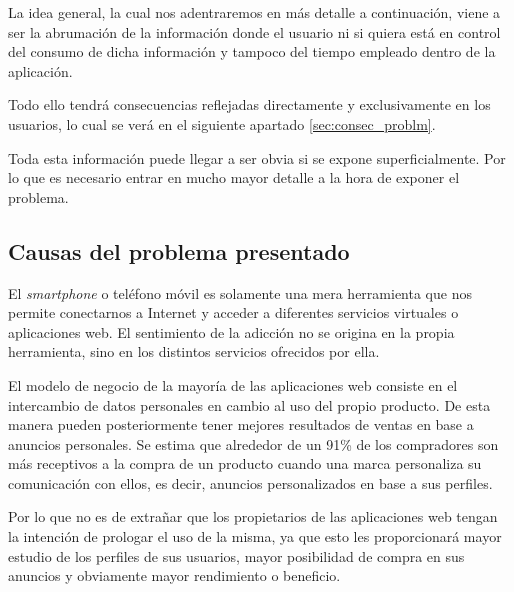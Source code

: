 \vspace{0.3cm}

La idea general, la cual nos adentraremos en más detalle a continuación, viene a ser la abrumación de la información donde el usuario ni si quiera está en control del consumo de dicha información y tampoco del tiempo empleado dentro de la aplicación.

\vspace{0.3cm}

Todo ello tendrá consecuencias reflejadas directamente y exclusivamente en los usuarios, lo cual se verá en el siguiente apartado \ref{sec:consec_problm}.

\vspace{0.3cm}

Toda esta información puede llegar a ser obvia si se expone superficialmente. Por lo que es necesario entrar en mucho mayor detalle a la hora de exponer el problema.

\subsection{Causas del problema presentado}

El \textit{smartphone} o teléfono móvil es solamente una mera herramienta que nos permite conectarnos a Internet y acceder a diferentes servicios virtuales o aplicaciones web. El sentimiento de la adicción no se origina en la propia herramienta, sino en los distintos servicios ofrecidos por ella.

\vspace{0.3cm}

El modelo de negocio de la mayoría de las aplicaciones web consiste en el intercambio de datos personales en cambio al uso del propio producto. De esta manera pueden posteriormente tener mejores resultados de ventas en base a anuncios personales. Se estima que alrededor de un 91\% de los compradores son más receptivos a la compra de un producto cuando una marca personaliza su comunicación con ellos, es decir, anuncios personalizados en base a sus perfiles. \cite{FORBES-RRSS-AS}

\vspace{0.3cm}

Por lo que no es de extrañar que los propietarios de las aplicaciones web tengan la intención de prologar el uso de la misma, ya que esto les proporcionará mayor estudio de los perfiles de sus usuarios, mayor posibilidad de compra en sus anuncios y obviamente mayor rendimiento o beneficio.


